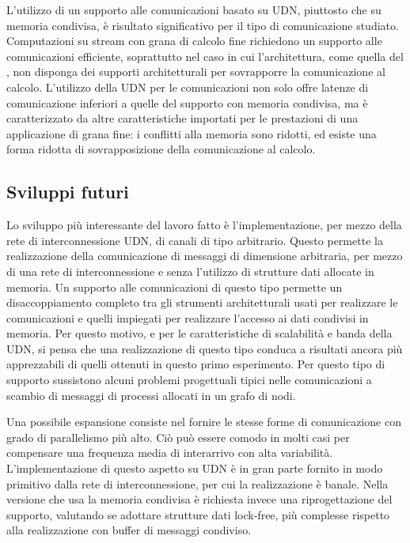 L'utilizzo di un supporto alle comunicazioni basato su UDN, piuttosto che su memoria condivisa, \`e risultato significativo per il tipo di comunicazione studiato. Computazioni su stream con grana di calcolo fine richiedono un supporto alle comunicazioni efficiente, soprattutto nel caso in cui l'architettura, come quella del \tile, non disponga dei supporti architetturali per sovrapporre la comunicazione al calcolo. L'utilizzo della UDN per le comunicazioni non solo offre latenze di comunicazione inferiori a quelle del supporto con memoria condivisa, ma \`e caratterizzato da altre caratteristiche importati per le prestazioni di una applicazione di grana fine: i conflitti alla memoria sono ridotti, ed esiste una forma ridotta di sovrapposizione della comunicazione al calcolo.

\subsection{Sviluppi futuri}
Lo sviluppo pi\`u interessante del lavoro fatto \`e l'implementazione, per mezzo della rete di interconnessione UDN, di canali di tipo arbitrario. Questo permette la realizzazione della comunicazione di messaggi di dimensione arbitraria, per mezzo di una rete di interconnessione e senza l'utilizzo di strutture dati allocate in memoria. Un supporto alle comunicazioni di questo tipo permette un disaccoppiamento completo tra gli strumenti architetturali usati per realizzare le comunicazioni e quelli impiegati per realizzare l'accesso ai dati condivisi in memoria. Per questo motivo, e per le caratteristiche di scalabilit\`a e banda della UDN, si pensa che una realizzazione di questo tipo conduca a risultati ancora pi\`u apprezzabili di quelli ottenuti in questo primo esperimento.
Per questo tipo di supporto sussistono alcuni problemi progettuali tipici nelle comunicazioni a scambio di messaggi di processi allocati in un grafo di nodi.

Una possibile espansione consiste nel fornire le stesse forme di comunicazione con grado di parallelismo pi\`u alto. Ci\`o pu\`o essere comodo in molti casi per compensare una frequenza media di interarrivo con alta variabilit\`a. L'implementazione di questo aspetto su UDN \`e in gran parte fornito in modo primitivo dalla rete di interconnessione, per cui la realizzazione \`e banale. Nella versione che usa la memoria condivisa \`e richiesta invece una riprogettazione del supporto, valutando se adottare strutture dati lock-free, pi\`u complesse rispetto alla realizzazione con buffer di messaggi condiviso.

